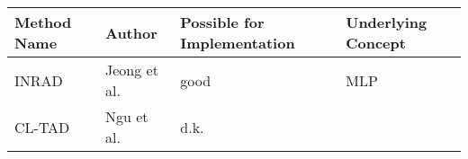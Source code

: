 \begin{longtable}[]{@{}llll@{}}
\toprule\noalign{}
Method Name & Author & Possible for Implementation & Underlying
Concept \\
\midrule\noalign{}
\endhead
\bottomrule\noalign{}
\endlastfoot
INRAD & Jeong et al. & good & MLP \\
CL-TAD & Ngu et al. & d.k. & \\
\end{longtable}
